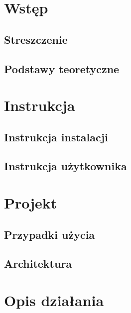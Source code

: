


	
	\newpage
	
	\newpage

	\tableofcontents
	\newpage

	\chapter{Wstęp}\label{chap:wstęp}
	\section{Streszczenie}\label{sec:streszczenie}
	
	\newpage
	\section{Podstawy teoretyczne}\label{sec:podstawy teoretyczne}
	

	\chapter{Instrukcja}\label{chap:instrukcja}
	\section{Instrukcja instalacji}\label{sec:instrukcja użytkownika}
	
	\section{Instrukcja użytkownika}\label{sec:instrukcja użytkownika}
	

	\chapter{Projekt}\label{chap:projekt}
	\section{Przypadki użycia}\label{sec:przypadki użycia}
	
	\section{Architektura}\label{sec:architektura}
	

	\chapter{Opis działania}\label{chap:opis dzialania}
